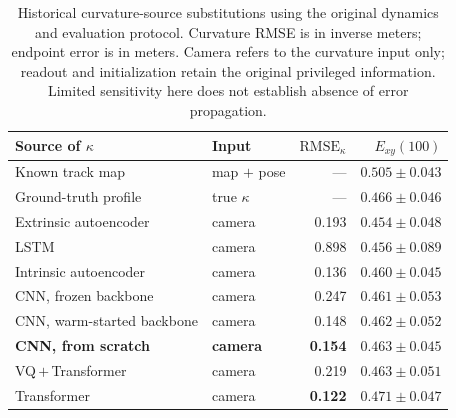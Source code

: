 \documentclass[preprint,12pt]{elsarticle}
\begin{document}
\begin{table}[t]
\centering
\caption{Historical curvature-source substitutions using the original dynamics and evaluation protocol. Curvature RMSE is in inverse meters; endpoint error is in meters. Camera refers to the curvature input only; readout and initialization retain the original privileged information. Limited sensitivity here does not establish absence of error propagation.}
\label{tab:kappa_source}
\footnotesize
\setlength{\tabcolsep}{4.5pt}
\begin{tabular}{llrr}
\toprule
Source of $\kappa$ & Input & $\mathrm{RMSE}_\kappa$ & $E_{xy}(100)$ \\
\midrule
Known track map            & map $+$ pose  & ---   & $0.505 \pm 0.043$ \\
Ground-truth profile       & true $\kappa$ & ---   & $0.466 \pm 0.046$ \\
\midrule
Extrinsic autoencoder      & camera & 0.193 & $\mathbf{0.454 \pm 0.048}$ \\
LSTM                       & camera & 0.898 & $0.456 \pm 0.089$ \\
Intrinsic autoencoder      & camera & 0.136 & $0.460 \pm 0.045$ \\
CNN, frozen backbone       & camera & 0.247 & $0.461 \pm 0.053$ \\
CNN, warm-started backbone & camera & 0.148 & $0.462 \pm 0.052$ \\
\textbf{CNN, from scratch} & \textbf{camera} & \textbf{0.154} & $\mathbf{0.463 \pm 0.045}$ \\
VQ\,$+$\,Transformer       & camera & 0.219 & $0.463 \pm 0.051$ \\
Transformer                & camera & \textbf{0.122} & $0.471 \pm 0.047$ \\
\bottomrule
\end{tabular}
\end{table}
\end{document}
